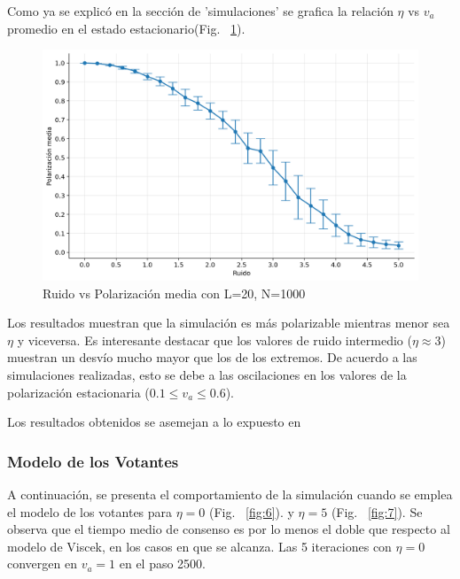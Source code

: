 \documentclass{article}
\begin{document}
Como ya se explicó en la sección de 'simulaciones' se grafica la relación \(\eta\) vs \(v_a\) promedio en el estado estacionario(Fig. ~\ref{fig:5}).

\begin{figure}[H]
    \centering
    \includegraphics[width=1\linewidth]{mean-last1000-vs-noise-svm.png}
    \caption{Ruido vs Polarización media con L=20, N=1000}
    \label{fig:5}
\end{figure}

Los resultados muestran que la simulación es más polarizable mientras menor sea \(\eta\) y viceversa. Es interesante destacar que los valores de ruido intermedio (\(\eta \approx 3\)) muestran un desvío mucho mayor que los de los extremos. De acuerdo a las simulaciones realizadas, esto se debe a las oscilaciones en los valores de la polarización estacionaria (\(0.1\leq v_a\leq0.6\)).

Los resultados obtenidos se asemejan a lo expuesto en \cite{vicsek1995}




\subsubsection{Modelo de los Votantes}

A continuación, se presenta el comportamiento de la simulación cuando se emplea el modelo de los votantes para  \(\eta =0\) (Fig. ~\ref{fig:6}).  y \(\eta =5\) (Fig. ~\ref{fig:7}). Se observa que el tiempo medio de consenso es por lo menos el doble que respecto al modelo de Viscek, en los casos en que se alcanza. Las 5 iteraciones con \(\eta=0\) convergen en \(v_a=1\) en el paso 2500.
\end{document}

